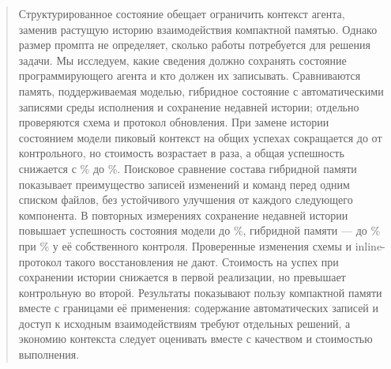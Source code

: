 \begin{abstract}
Структурированное состояние обещает ограничить контекст агента, заменив растущую историю взаимодействия компактной памятью. Однако размер промпта не определяет, сколько работы потребуется для решения задачи. Мы исследуем, какие сведения должно сохранять состояние программирующего агента и кто должен их записывать. Сравниваются память, поддерживаемая моделью, гибридное состояние с автоматическими записями среды исполнения и сохранение недавней истории; отдельно проверяются схема и протокол обновления. При замене истории состоянием модели пиковый контекст на общих успехах сокращается до \ModelStatePeakRatio{} от контрольного, но стоимость возрастает в \ModelStateCostRatio{} раза, а общая успешность снижается с \ModelControlRate\% до \ModelStateRate\%. Поисковое сравнение состава гибридной памяти показывает преимущество записей изменений и команд перед одним списком файлов, без устойчивого улучшения от каждого следующего компонента. В повторных измерениях сохранение недавней истории повышает успешность состояния модели до \ModelHistorySixRate\%, гибридной памяти --- до \HybridHistorySixRate\% при \HybridControlRate\% у её собственного контроля. Проверенные изменения схемы и inline-протокол такого восстановления не дают. Стоимость на успех при сохранении истории снижается в первой реализации, но превышает контрольную во второй. Результаты показывают пользу компактной памяти вместе с границами её применения: содержание автоматических записей и доступ к исходным взаимодействиям требуют отдельных решений, а экономию контекста следует оценивать вместе с качеством и стоимостью выполнения.
\end{abstract}
